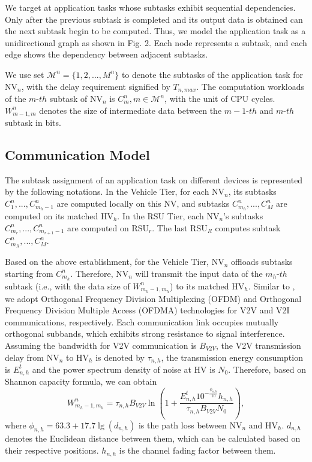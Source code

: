 \documentclass[lettersize,journal]{IEEEtran}
\begin{document}
We target at application tasks whose subtasks exhibit sequential dependencies. Only after the previous subtask is completed and its output data is obtained can the next subtask begin to be computed. Thus, we model the application task as a unidirectional graph as shown in Fig. 2. Each node represents a subtask, and each edge shows the dependency between adjacent subtasks.

We use set $\mathcal{M}^n=\{1,2, ...,M^n\}$ to denote the subtasks of the application task for NV$_n$, with the delay requirement signified by $T_{n,max}$. The computation workloads of the $m\mbox{-}th$ subtask of NV$_n$ is $C^n_m , m\in\mathcal{M}^n$, with the unit of CPU cycles. $W^n_{m-1,m}$ denotes the size of intermediate data between the $m-1\mbox{-}th$ and $m\mbox{-}th$ subtask in bits.



\subsection{Communication Model}

The subtask assignment of an application task on different devices is represented by the following notations. In the Vehicle Tier, for each NV$_n$, its subtasks $C_1^n , ..., C_{m_h-1}^n$ are computed locally on this NV, and subtasks $C_{m_h}^n , ..., C_M^n$ are computed on its matched HV$_h$. In the RSU Tier, each NV$_n$'s subtasks $C^n_{m_r} , ..., C^n_{m_{r+1}-1}$ are computed on RSU$_r$. The last RSU$_R$ computes subtask $C^n_{m_R} , ..., C^n_M$.

Based on the above establishment, for the Vehicle Tier, NV$_n$ offloads subtasks starting from $C_{m_h}^n$. Therefore, NV$_n$ will transmit the input data of the $m_h\mbox{-}th$ subtask (i.e., with the data size of $W_{m_h-1,m_h}^n$) to its matched HV$_h$. Similar to \cite{ref16,ref21}, we adopt Orthogonal Frequency Division Multiplexing (OFDM) and Orthogonal Frequency Division Multiple Access (OFDMA) technologies for V2V and V2I communications, respectively. Each communication link occupies mutually orthogonal subbands, which exhibits strong resistance to signal interference. Assuming the bandwidth for V2V communication is $B_{V2V}$, the V2V transmission delay from NV$_n$ to HV$_h$ is denoted by $\tau_{n,h}$, the transmission energy consumption is $E^t_{n,h}$ and the power spectrum density of noise at HV is $N_0$. Therefore, based on Shannon capacity formula, we can obtain\\
\begin{equation*}
W_{m_h-1,m_h}^n = \tau_{n,h}B_{V2V}\ln\left(1+\dfrac{E_{n,h}^t 10^{-\frac{\phi_{n,h}}{10}} h_{n,h}}{\tau_{n,h}B_{V2V}N_0}\right), \tag{1}
\end{equation*}
where $\phi_{n,h}=63.3+17.7\lg(d_{n,h})$ \cite{ref15} is the path loss between NV$_n$ and HV$_h$. $d_{n,h}$ denotes the Euclidean distance between them, which can be calculated based on their respective positions. $h_{n,h}$ is the channel fading factor between them.
\end{document}
